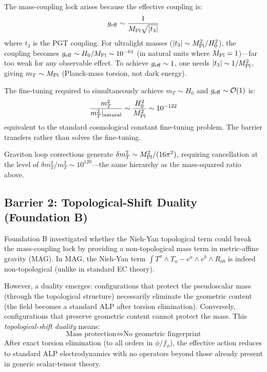 \documentclass[aps,prd,twocolumn,superscriptaddress,showpacs,preprintnumbers,nofootinbib,longbibliography,floatfix]{revtex4-2}
\newcommand{\MPl}{M_{\rm Pl}}
\begin{document}
The mass-coupling lock arises because the effective coupling is:
\begin{equation}
g_{\rm eff} \sim \frac{1}{\MPl \sqrt{|t_3|}}
\end{equation}
where $t_3$ is the PGT coupling. For ultralight masses ($|t_3| \sim \MPl^2/H_0^2$), the coupling becomes $g_{\rm eff} \sim H_0/\MPl \sim 10^{-61}$ (in natural units where $\MPl = 1$)---far too weak for any observable effect. To achieve $g_{\rm eff} \sim 1$, one needs $|t_3| \sim 1/\MPl^2$, giving $m_T \sim \MPl$ (Planck-mass torsion, not dark energy).

The fine-tuning required to simultaneously achieve $m_T \sim H_0$ and $g_{\rm eff} \sim \mathcal{O}(1)$ is:
\begin{equation}
\frac{m_T^2}{m_T^2|_{\rm natural}} \sim \frac{H_0^2}{\MPl^2} \sim 10^{-122}
\end{equation}
equivalent to the standard cosmological constant fine-tuning problem. The barrier transfers rather than solves the fine-tuning.

Graviton loop corrections generate $\delta m_T^2 \sim \MPl^2/(16\pi^2)$, requiring cancellation at the level of $\delta m_T^2/m_T^2 \sim 10^{120}$---the same hierarchy as the mass-squared ratio above.

\subsection{Barrier 2: Topological-Shift Duality (Foundation B)}

Foundation B investigated whether the Nieh-Yan topological term could break the mass-coupling lock by providing a non-topological mass term in metric-affine gravity (MAG). In MAG, the Nieh-Yan term $\int T^a \wedge T_a - e^a \wedge e^b \wedge R_{ab}$ is indeed non-topological (unlike in standard EC theory).

However, a duality emerges: configurations that protect the pseudoscalar mass (through the topological structure) necessarily eliminate the geometric content (the field becomes a standard ALP after torsion elimination). Conversely, configurations that preserve geometric content cannot protect the mass. This \emph{topological-shift duality} means:
\begin{equation}
\text{Mass protection} \iff \text{No geometric fingerprint}
\end{equation}
After exact torsion elimination (to all orders in $\phi/f_\phi$), the effective action reduces to standard ALP electrodynamics with no operators beyond those already present in generic scalar-tensor theory.
\end{document}
